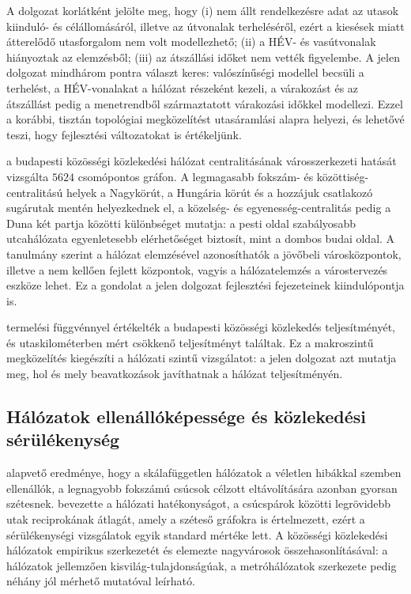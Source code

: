 \documentclass[12pt,a4paper]{article}
\theoremstyle{definition}
\theoremstyle{remark}
\begin{document}
A dolgozat korlátként jelölte meg, hogy (i) nem állt rendelkezésre adat az
utasok kiinduló- és célállomásáról, illetve az útvonalak terheléséről, ezért
a kiesések miatt átterelődő utasforgalom nem volt modellezhető; (ii) a HÉV- és
vasútvonalak hiányoztak az elemzésből; (iii) az átszállási időket nem vették
figyelembe. A jelen dolgozat mindhárom pontra választ keres: valószínűségi
modellel becsüli a terhelést, a HÉV-vonalakat a hálózat részeként kezeli, a
várakozást és az átszállást pedig a menetrendből származtatott
várakozási időkkel modellezi. Ezzel a korábbi, tisztán topológiai
megközelítést utasáramlási alapra helyezi, és lehetővé teszi, hogy
fejlesztési változatokat is értékeljünk.

\citet{qasseer2025} a budapesti közösségi közlekedési hálózat centralitásának
városszerkezeti hatását vizsgálta $5624$ csomópontos gráfon. A legmagasabb
fokszám- és közöttiség-centralitású helyek a Nagykörút, a Hungária körút és
a hozzájuk csatlakozó sugárutak mentén helyezkednek el, a közelség- és
egyenesség-centralitás pedig a Duna két partja közötti különbséget mutatja: a
pesti oldal szabályosabb utcahálózata egyenletesebb elérhetőséget biztosít,
mint a dombos budai oldal. A tanulmány szerint a hálózat elemzésével
azonosíthatók a jövőbeli városközpontok, illetve a nem kellően fejlett
központok, vagyis a hálózatelemzés a várostervezés eszköze lehet. Ez a
gondolat a jelen dolgozat fejlesztési fejezeteinek kiindulópontja is.

\citet{gaal2014} termelési függvénnyel értékelték a budapesti közösségi
közlekedés teljesítményét, és utaskilométerben mért csökkenő teljesítményt
találtak. Ez a makroszintű megközelítés kiegészíti a hálózati szintű
vizsgálatot: a jelen dolgozat azt mutatja meg, hol és mely beavatkozások
javíthatnak a hálózat teljesítményén.

\subsection{Hálózatok ellenállóképessége és közlekedési sérülékenység}

\citet{albert2000} alapvető eredménye, hogy a skálafüggetlen hálózatok a
véletlen hibákkal szemben ellenállók, a legnagyobb fokszámú csúcsok célzott
eltávolítására azonban gyorsan szétesnek. \citet{latora2001} bevezette a
hálózati hatékonyságot, a csúcspárok közötti legrövidebb utak reciprokának
átlagát, amely a széteső gráfokra is értelmezett, ezért a sérülékenységi
vizsgálatok egyik standard mértéke lett. A közösségi közlekedési hálózatok
empirikus szerkezetét \citet{vonferber2009} és \citet{derrible2010}
elemezte nagyvárosok összehasonlításával: a hálózatok jellemzően
kisvilág-tulajdonságúak, a metróhálózatok szerkezete pedig néhány jól
mérhető mutatóval leírható.
\end{document}
